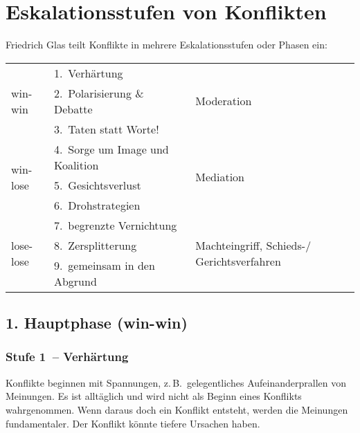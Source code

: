 \section{Eskalationsstufen von Konflikten}
\label{eskalationsstufen}

Friedrich Glas \cite{glasl-konfliktmanegement} teilt Konflikte in mehrere Eskalationsstufen oder Phasen ein:

\vspace{1em}

\begin{tabular}{ l l l }
  \multirow{3}{5em}{win-win}   & 1.~Verhärtung                   & \multirow{3}{5em}{Moderation} \\
                               & 2.~Polarisierung \& Debatte \\
                               & 3.~Taten statt Worte! \\ \hline
  \multirow{3}{5em}{win-lose}  & 4.~Sorge um Image und Koalition & \multirow{3}{5em}{Mediation} \\
                               & 5.~Gesichtsverlust & \\
                               & 6.~Drohstrategien & \\ \hline
  \multirow{3}{5em}{lose-lose} & 7.~begrenzte Vernichtung        & \multirow{3}{5em}{Machteingriff, Schieds-/ Gerichtsverfahren} \\
                               & 8.~Zersplitterung & \\
                               & 9.~gemeinsam in den Abgrund & \\
\end{tabular}


\subsection{1. Hauptphase (win-win)}

\subsubsection{Stufe 1~-- Verhärtung}

Konflikte beginnen mit Spannungen, z.\,B.~gelegentliches Aufeinanderprallen von Meinungen. Es ist alltäglich und wird nicht als Beginn eines Konflikts wahrgenommen. Wenn daraus doch ein Konflikt entsteht, werden die Meinungen fundamentaler. Der Konflikt könnte tiefere Ursachen haben.

